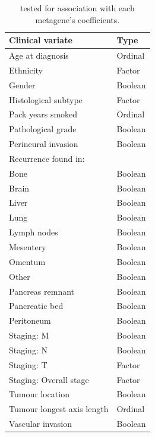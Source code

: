\documentclass[dissertation.tex]{subfiles}
\begin{document}
\begin{table}[h]
\centering
\caption{ tested for association with each metagene's coefficients. \label{tab:sigs-clinvar-table}}
\begin{tabular}{@{}ll@{}}
\toprule
Clinical variate           & Type    \\ \midrule
Age at diagnosis           & Ordinal \\
Ethnicity                  & Factor  \\
Gender                     & Boolean \\
Histological subtype       & Factor  \\
Pack years smoked          & Ordinal \\
Pathological grade         & Boolean \\
Perineural invasion        & Boolean \\
Recurrence found in:           &         \\
\quad Bone                       & Boolean \\
\quad Brain                      & Boolean \\
\quad Liver                      & Boolean \\
\quad Lung                       & Boolean \\
\quad Lymph nodes                & Boolean \\
\quad Mesentery                  & Boolean \\
\quad Omentum                    & Boolean \\
\quad Other                      & Boolean \\
\quad Pancreas remnant           & Boolean \\
\quad Pancreatic bed             & Boolean \\
\quad Peritoneum                 & Boolean \\
Staging: M                 & Boolean \\
Staging: N                 & Boolean \\
Staging: T                 & Factor  \\
Staging: Overall stage     & Factor  \\
Tumour location            & Boolean \\
Tumour longest axis length & Ordinal \\
Vascular invasion          & Boolean \\
\bottomrule
\end{tabular}
\end{table}
\end{document}
